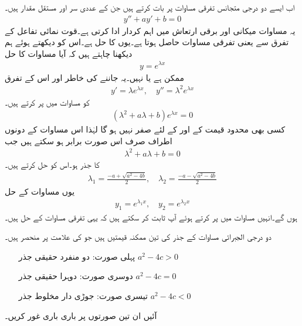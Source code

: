 اب ایسے دو درجی متجانس تفرقی مساوات پر بات کرتے ہیں جن کے عددی سر  اور  مستقل مقدار ہیں۔
\begin{align}\label{مساوات_سادہ_دو_درجی_مستقل_عددی_سر_الف}
y''+ay'+b=0
\end{align} 
یہ مساوات میکانی اور برقی ارتعاش میں اہم کردار ادا کرتی ہے۔قوت نمائی تفاعل  کے تفرق سے  یعنی  تفرقی مساوات حاصل ہوتا ہے۔یوں  کا حل  ہے۔اس کو دیکھتے ہوئے ہم دیکھنا چاہتے ہیں کہ آیا مساوات  کا حل
\begin{align}\label{مساوات_سادہ_دو_درجی_مستقل_عددی_سر_ب}
y=e^{\lambda x}
\end{align}
 ممکن ہے یا نہیں۔یہ جاننے کی خاطر  اور اس کے تفرق
\begin{align*}
y'=\lambda e^{\lambda x}, \quad y''=\lambda^2 e^{\lambda x}
\end{align*}
 کو  مساوات  میں پر کرتے  ہیں۔
\begin{align*}
(\lambda^2+a\lambda+b)e^{\lambda x}=0
\end{align*}  
کسی بھی محدود قیمت کے  اور  کے لئے  صفر نہیں ہو گا لہٰذا اس مساوات کے دونوں اطراف صرف اس صورت برابر ہو سکتے ہیں جب  
 \begin{align}\label{مساوات_سادہ_دو_درجی_مستقل_عددی_سر_پ}
\lambda^2+a\lambda+b=0
\end{align}
 کا جذر ہو۔اس  کو حل کرتے ہیں۔
\begin{align}\label{مساوات_سادہ_دو_درجی_مستقل_عددی_سر_ت}
\lambda_1=\frac{-a+\sqrt{a^2-4b}}{2}, \quad \lambda_2=\frac{-a-\sqrt{a^2-4b}}{2}
\end{align}
یوں مساوات  کے حل
\begin{align}
y_1=e^{\lambda_1 x}, \quad y_2=e^{\lambda_2 x}
\end{align}
ہوں گے۔انہیں مساوات  میں پر کرتے ہوئے آپ ثابت کر سکتے ہیں کہ یہی تفرقی مساوات کے حل ہیں۔

دو درجی الجبرائی مساوات  کے جذر کی تین ممکنہ قیمتیں ہیں جو  کی علامت   پر منحصر ہیں۔
\begin{itemize}\label{لسٹ_سادہ_دو_درجی_تین_صورتیں_الف}
\item[پہلی صورت:]
دو منفرد حقیقی جذر \quad $a^2-4c>0$ 
\item[دوسری صورت:]
 دوہرا حقیقی جذر \quad $a^2-4c=0$ 
\item[تیسری صورت:]
 جوڑی دار مخلوط جذر \quad $a^2-4c<0$ 
\end{itemize}
آئیں ان تین صورتوں پر باری باری غور کریں۔

